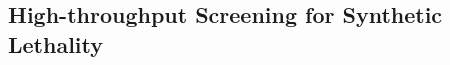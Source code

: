 \subsection[High{}-throughput Screening for Synthetic Lethality]{High-throughput Screening for Synthetic Lethality}




